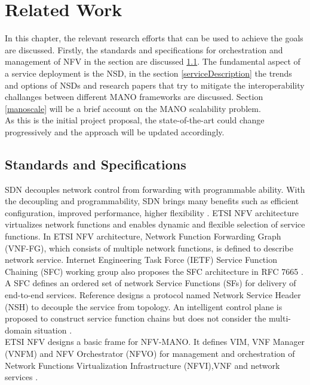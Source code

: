 \chapter{Related Work}
\label{ch:Related Work}

In this chapter, the relevant research efforts that can be used to achieve the goals are discussed. Firstly, the standards and specifications for orchestration and management of NFV in the section are discussed \ref{standSpecs}. The fundamental aspect of a service deployment is the NSD, in the section \ref{serviceDescription} the trends and options of NSDs and research papers that try to mitigate the interoperability challanges between different MANO frameworks are discussed. Section \ref{manoscale} will be a brief account on the MANO scalability problem.\\

As this is the initial project proposal, the state-of-the-art could change progressively and the approach will be updated accordingly.


\section{Standards and Specifications}
\label{standSpecs}
SDN decouples network control from forwarding with programmable ability. With the decoupling and programmability, SDN brings many benefits such as efficient configuration, improved performance, higher flexibility \cite{xia2015survey}. ETSI NFV \cite{nfv2network} architecture virtualizes network functions and enables dynamic and flexible selection of service functions. In ETSI NFV architecture, Network Function Forwarding Graph (VNF-FG), which consists of multiple network functions, is defined to describe network service. Internet Engineering Task Force (IETF) Service Function Chaining (SFC) working group also proposes the SFC architecture in RFC 7665 \cite{halpern2015service}. A SFC defines an ordered set of network Service Functions (SFs) for delivery of end-to-end services. Reference \cite{quinn2016network} designs a protocol named Network Service Header (NSH) to decouple the service from topology. An intelligent control plane is proposed to construct service function chains but does not consider the multi-domain situation \cite{boucadair2016service}.\\

ETSI NFV designs a basic frame for NFV-MANO. It defines VIM, VNF Manager (VNFM) and NFV Orchestrator (NFVO) for management and orchestration of Network Functions Virtualization Infrastructure (NFVI),VNF and network services \cite{etsi2014gs}.


